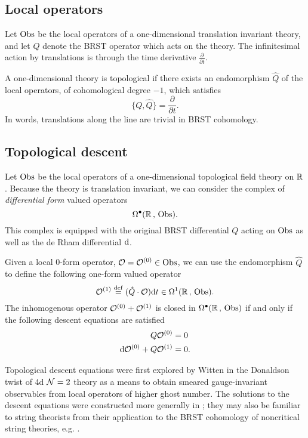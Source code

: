 \documentclass[11pt]{amsart}
\def\define{\overset{\rm def}{=}}
\begin{document}
\subsection{Local operators}

Let ${\rm Obs}$ be the local operators of a one-dimensional translation invariant theory, and let $Q$ denote the BRST operator which acts on the theory.
The infinitesimal action by translations is through the time derivative $\frac{\partial}{\partial t}$. 

A one-dimensional theory is topological if there exists an endomorphism $\hat{Q}$ of the local operators, of cohomological degree $-1$, which satisfies
\[
\{Q, \hat{Q}\} = \frac{\partial}{\partial t} .
\]
In words, translations along the line are trivial in BRST cohomology. 


\subsection{Topological descent} 

Let ${\rm Obs}$ be the local operators of a one-dimensional topological field theory on $\mathbb R$. 
Because the theory is translation invariant, we can consider the complex of {\em differential form} valued operators
\[
\Omega^\bullet(\mathbb R \, , \, {\rm Obs}) .
\]
This complex is equipped with the original BRST differential $Q$ acting on ${\rm Obs}$ as well as the de Rham differential ${\rm d}$. 

Given a local 0-form operator, $\mathcal O = \mathcal O^{(0)} \in {\rm Obs}$, we can use the endomorphism $\hat{Q}$ to define the following one-form valued operator
\[
\cO^{(1)} \define (\hat{Q} \cdot \cO) \d t \in \Omega^1(\RR \, , \, \Obs).
\]
The inhomogenous operator $\mathcal O^{(0)} + \mathcal O^{(1)}$ is closed in $\Omega^\bullet(\mathbb R \, , \, {\rm Obs})$ if and only if the following descent equations are satisfied 
\begin{align*}
Q \mathcal O^{(0)} & = 0 \\
{\rm d} \mathcal O^{(0)} + Q \mathcal O^{(1)} & = 0 .
\end{align*}

Topological descent equations were first explored by Witten in the Donaldson twist of 4d $\mathcal N=2$ theory \cite{W88} as a means to obtain smeared gauge-invariant observables from local operators of higher ghost number. The solutions to the descent equations were constructed more generally in \cite{MW97}; they may also be familiar to string theorists from their application to the BRST cohomology of noncritical string theories, e.g. \cite{WZ92}. 
\end{document}
